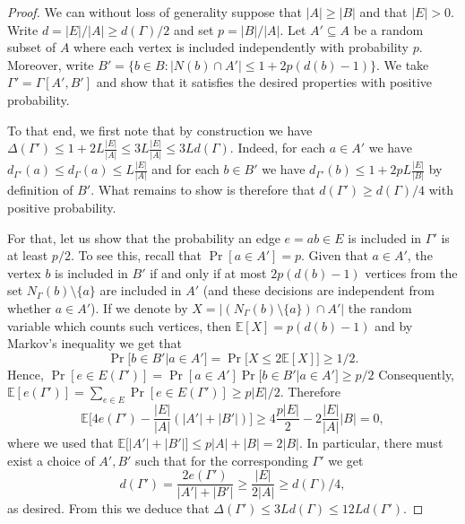 \documentclass[10pt, a4paper]{article}
\numberwithin{theorem}{section} %
\theoremstyle{remark}
\theoremstyle{definition}
\newcommand{\bE}{\mathbb{E}}
\begin{document}
\begin{proof}
    We can without loss of generality suppose that $|A| \geq |B|$ and that $|E| > 0$.
    Write $d = |E|/|A|\ge d(\Gamma)/2$ and set $p = |B| / |A|$. 
    Let $A' \subseteq A$ be a random subset of $A$ where each vertex is included independently with probability $p$.
    Moreover, write $B' = \{ b\in B: |N(b)\cap A'| \leq 1 + 2p(d(b) - 1)\}$.
    We take $\Gamma' = \Gamma[A', B']$ and show that it satisfies the desired properties with positive probability.

    To that end, we first note that by construction we have $\Delta(\Gamma') \leq 1 + 2L\frac{|E|}{|A|} \leq 3L\frac{|E|}{|A|} \leq 3L d(\Gamma)$.
    Indeed, for each $a \in A'$ we have $d_{\Gamma'}(a) \leq d_{\Gamma}(a) \leq L\frac{|E|}{|A|}$ and for each $b \in B'$ we have $d_{\Gamma'}(b) \leq 1+ 2pL\frac{|E|}{|B|}$ by definition of $B'$.
    What remains to show is therefore that $d(\Gamma') \geq d(\Gamma)/4$ with positive probability.

    For that, let us show that the probability an edge $e = ab \in E$ is included in $\Gamma'$ is at least $p/2$. To see this, recall that $\Pr[a\in A']=p$. Given that $a\in A'$, the vertex $b$ is included in $B'$ if and only if at most $2p(d(b)-1)$ vertices from the set $N_{\Gamma}(b) \setminus \{a\}$ are included in $A'$ (and these decisions are independent from whether $a\in A'$). If we denote by $X=\big|(N_{\Gamma}(b) \setminus \{a\})\cap A'\big|$ the random variable which counts such vertices, then $\bE[X]=p(d(b)-1)$ and by Markov's inequality we get that
    \[\Pr\big[b \in B'| a \in A'\big] = \Pr\big[X \leq 2\mathbb{E}[X]\big] \geq 1/2.\]
    Hence, $\Pr[e\in E(\Gamma')]=\Pr[a\in A']\Pr\big[b \in B'| a \in A'\big]\geq p/2$
    Consequently, $\mathbb{E}[e(\Gamma')] = \sum_{e \in E} \Pr[e\in E(\Gamma')] \geq p|E|/2$.
    Therefore
    \[
        \mathbb{E}\Big[4e(\Gamma') - \frac{|E|}{|A|} (|A'| + |B'|)\Big] \geq 4\frac{p|E|}{2} - 2\frac{|E|}{|A|}|B| = 0,
    \]
    where we used that $\mathbb{E}\big[|A'| + |B'|\big] \leq p|A| + |B| = 2|B|$.
    In particular, there must exist a choice of $A', B'$ such that for the corresponding $\Gamma'$ we get
    \[
        d(\Gamma') = \frac{2e(\Gamma')}{|A'| + |B'|}\geq \frac{|E|}{2|A|} \ge d(\Gamma)/4,
    \]
    as desired. From this we deduce that $\Delta(\Gamma')\leq 3L d(\Gamma)\leq 12Ld(\Gamma')$.
\end{proof}
\end{document}
